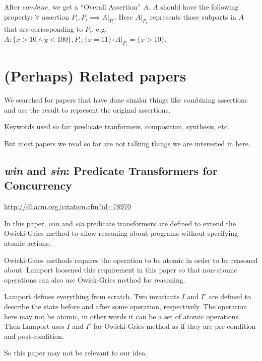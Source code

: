 \documentclass[12pt, fleqn]{article}
\begin{document}
\bigskip

After $combine$, we get a ``Overall Assertion'' $A$. $A$ should have
the following property: $\forall$ assertion $P_i, P_i \implies
A|_{P_i}$.  Here $A|_{P_i}$ represents those subparts in $A$ that are
corresponding to $P_i$. e.g. $A: \{x > 10 \land y < 100\}, P_i: \{x =
11\} \therefore A|_{P_i} = \{x > 10\}$.


\section{(Perhaps) Related papers}

We searched for papers that have done similar things like combining
assertions and use the result to represent the original assertions.

Keywords used so far: predicate tranformers, composition, synthesis,
etc.

But most papers we read so far are not talking things we are
interested in here..

\subsection{\textsl{win} and \textsl{sin}: Predicate Transformers for Concurrency}

\url{http://dl.acm.org/citation.cfm?id=78970}

\bigskip

In this paper, \textsl{win} and \textsl{sin} predicate transformers
are defined to extend the Owicki-Gries method to allow reasoning about
programs without specifying atomic actions.

Owicki-Gries methods requires the operation to be atomic in order to
be reasoned about. Lamport loosened this requirement in this paper so
that non-atomic operations can also use Owick-Gries method for
reasoning.

Lamport defines everything from scratch. Two invariants $I$ and $I'$
are defined to describe the state before and after some operation,
respectively. The operation here may not be atomic, in other words it
can be a set of atomic operations. Then Lamport uses $I$ and $I'$ for
Owicki-Gries method as if they are pre-condition and post-condition.

So this paper may not be relevant to our idea.

\end{document}
